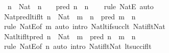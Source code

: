 \begin{isabellebody}
\ \ {\isachardoublequoteopen}n\ {\isacharcolon}{\kern0pt}\ Nat\ {\isasymLongrightarrow}\ n\ {\isasymnoteq}\ {}\ {\isasymLongrightarrow}\ pred\ n\ {\isacharless}{\kern0pt}\ n{\isachardoublequoteclose}\isanewline
%
\isadelimproof
\ \ %
\endisadelimproof
%
\isatagproof
{}\isamarkupfalse%
\ {\isacharparenleft}{\kern0pt}rule\ NatE{\isacharparenright}{\kern0pt}\ auto%
\endisatagproof
{\isafoldproof}%
%
\isadelimproof
\isanewline
%
\endisadelimproof
\isanewline
{}\isamarkupfalse%
\ Nat{\isacharunderscore}{\kern0pt}pred{\isacharunderscore}{\kern0pt}lt{\isacharunderscore}{\kern0pt}if{\isacharunderscore}{\kern0pt}lt{\isacharcolon}{\kern0pt}\ {\isachardoublequoteopen}n\ {\isacharcolon}{\kern0pt}\ Nat\ {\isasymLongrightarrow}\ m\ {\isacharless}{\kern0pt}\ n\ {\isasymLongrightarrow}\ pred\ m\ {\isacharless}{\kern0pt}\ n{\isachardoublequoteclose}\isanewline
%
\isadelimproof
\ \ %
\endisadelimproof
%
\isatagproof
{}\isamarkupfalse%
\ {\isacharparenleft}{\kern0pt}rule\ NatE{\isacharbrackleft}{\kern0pt}of\ m{\isacharbrackright}{\kern0pt}{\isacharparenright}{\kern0pt}\ {\isacharparenleft}{\kern0pt}auto\ intro{\isacharcolon}{\kern0pt}\ Nat{\isacharunderscore}{\kern0pt}lt{\isacharunderscore}{\kern0pt}if{\isacharunderscore}{\kern0pt}succ{\isacharunderscore}{\kern0pt}lt\ Nat{\isacharunderscore}{\kern0pt}if{\isacharunderscore}{\kern0pt}lt{\isacharunderscore}{\kern0pt}Nat{\isacharparenright}{\kern0pt}%
\endisatagproof
{\isafoldproof}%
%
\isadelimproof
\isanewline
%
\endisadelimproof
\isanewline
{}\isamarkupfalse%
\ Nat{\isacharunderscore}{\kern0pt}lt{\isacharunderscore}{\kern0pt}if{\isacharunderscore}{\kern0pt}lt{\isacharunderscore}{\kern0pt}pred{\isacharcolon}{\kern0pt}\ {\isachardoublequoteopen}n\ {\isacharcolon}{\kern0pt}\ Nat\ {\isasymLongrightarrow}\ m\ {\isacharless}{\kern0pt}\ pred\ n\ {\isasymLongrightarrow}\ m\ {\isacharless}{\kern0pt}\ n{\isachardoublequoteclose}\isanewline
%
\isadelimproof
\ \ %
\endisadelimproof
%
\isatagproof
{}\isamarkupfalse%
\ {\isacharparenleft}{\kern0pt}rule\ NatE{\isacharbrackleft}{\kern0pt}of\ n{\isacharbrackright}{\kern0pt}{\isacharparenright}{\kern0pt}\ {\isacharparenleft}{\kern0pt}auto\ intro{\isacharcolon}{\kern0pt}\ Nat{\isacharunderscore}{\kern0pt}if{\isacharunderscore}{\kern0pt}lt{\isacharunderscore}{\kern0pt}Nat\ lt{\isacharunderscore}{\kern0pt}succ{\isacharunderscore}{\kern0pt}if{\isacharunderscore}{\kern0pt}lt{\isacharparenright}{\kern0pt}%
\endisatagproof
{\isafoldproof}%
%
\isadelimproof
\isanewline
%
\endisadelimproof
\isanewline
{}\isamarkupfalse%

\end{isabellebody}
